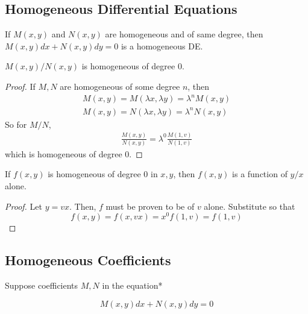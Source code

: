 \subsection{Homogeneous Differential Equations}

\begin{theorem}
    If $M(x,y)$ and $N(x,y)$ are homogeneous and of same degree, then $M(x,y)dx+N(x,y)dy=0$
    is a homogeneous DE.
\end{theorem}
    
\begin{theorem}
    $M(x,y)/N(x,y)$ is homogeneous of degree 0.

    \begin{proof}
        If $M,N$ are homogeneous of some degree $n$, then
        \begin{eqnarray}
            M(x,y)=M(\lambda x,\lambda y)=\lambda ^nM(x,y)\\
            M(x,y)=N(\lambda x,\lambda y)=\lambda ^nN(x,y)
        \end{eqnarray}
        So for $M/N$,
        \begin{eqnarray}
            \frac{M(x,y)}{N(x,y)}=\lambda^0\frac{M(1,v)}{N(1,v)}
        \end{eqnarray}
        which is homogeneous of degree 0.
    \end{proof}
\end{theorem}

\begin{theorem}
    If $f(x,y)$ is homogeneous of degree 0 in $x,y$, then $f(x,y)$ is a function of $y/x$ alone.
    \begin{proof}
        Let $y=vx$. Then, $f$ must be proven to be of $v$ alone. Substitute so that
        \begin{equation*}
            f(x,y)=f(x,vx)=x^0f(1,v)=f(1,v)
        \end{equation*}
    \end{proof}
\end{theorem}

\subsection{Homogeneous Coefficients}

Suppose coefficients $M,N$ in the equation*

\begin{equation*}
    M(x,y)dx+N(x,y)dy=0
\end{equation*}

